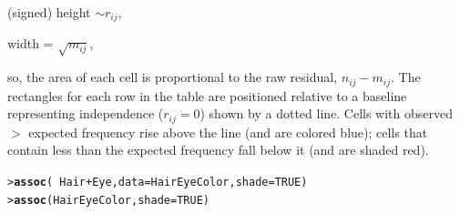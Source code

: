 \documentclass[10pt,krantz2]{krantz}\usepackage[]{graphicx}\usepackage[]{color}
\makeatletter
\newcommand{\hlnum}[1]{\textcolor[rgb]{0.686,0.059,0.569}{#1}}%
\newcommand{\hlopt}[1]{\textcolor[rgb]{0,0,0}{#1}}%
\newcommand{\hlstd}[1]{\textcolor[rgb]{0.345,0.345,0.345}{#1}}%
\newcommand{\hlkwc}[1]{\textcolor[rgb]{0.333,0.667,0.333}{#1}}%
\newcommand{\hlkwd}[1]{\textcolor[rgb]{0.737,0.353,0.396}{\textbf{#1}}}%
\newenvironment{kframe}{%
 \def\at@end@of@kframe{}%
 \ifinner\ifhmode%
  \def\at@end@of@kframe{\end{minipage}}%
  \begin{minipage}{\columnwidth}%
 \fi\fi%
 \def\FrameCommand##1{\hskip\@totalleftmargin \hskip-\fboxsep
 \colorbox{shadecolor}{##1}\hskip-\fboxsep
     \hskip-\linewidth \hskip-\@totalleftmargin \hskip\columnwidth}%
 \MakeFramed {\advance\hsize-\width
   \@totalleftmargin\z@ \linewidth\hsize
   \@setminipage}}%
 {\par\unskip\endMakeFramed%
 \at@end@of@kframe}
\newenvironment{knitrout}{}{} %
\renewenvironment{knitrout}{\small\renewcommand{\baselinestretch}{.85}}{} %
\makeatother
\begin{document}
\begin{itemize*}
\item (signed) height \(\sim r_{ij}\),

\item width = \(\sqrt { m_{ij}}\),
\end{itemize*}
so, the area of each cell is proportional to the raw residual,
\(n_{ij} - m_{ij}\).
The rectangles for each row in the table are positioned relative to a
baseline representing independence (\(r_{ij} = 0\)) shown by a dotted
line.  Cells with observed \(>\) expected frequency rise above the line
(and are colored blue); cells that contain less than the expected
frequency fall below it (and are shaded red).
\begin{knitrout}
\color{fgcolor}\begin{kframe}
\begin{alltt}
\hlstd{> }\hlkwd{assoc}\hlstd{(}\hlopt{~} \hlstd{Hair} \hlopt{+} \hlstd{Eye,} \hlkwc{data} \hlstd{= HairEyeColor,} \hlkwc{shade} \hlstd{=} \hlnum{TRUE}\hlstd{)}
\hlstd{> }\hlkwd{assoc}\hlstd{(HairEyeColor,} \hlkwc{shade} \hlstd{=} \hlnum{TRUE}\hlstd{)}
\end{alltt}
\end{kframe}
\end{knitrout}
\end{document}
